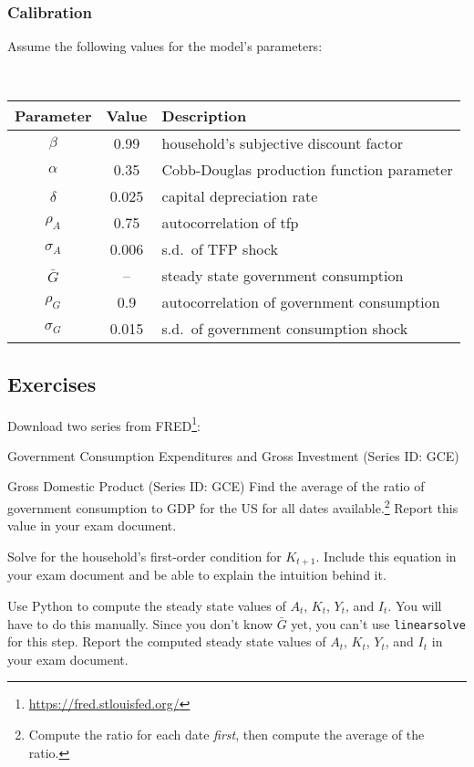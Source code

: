 \subsubsection{Calibration}

Assume the following values for the model's parameters:
	
	\
	
	\begin{center}
	\begin{tabular}{ccl}\textbf{Parameter} & \textbf{Value} & \textbf{Description}\\\hline
	$\beta$		& 0.99		& household's subjective discount factor\\
	$\alpha$	& 0.35		& Cobb-Douglas production function parameter\\
	$\delta$	& 0.025 	& capital depreciation rate\\
	$\rho_A$	& 0.75		& autocorrelation of tfp\\
	$\sigma_A$	& 0.006		& s.d.~of TFP shock\\
	$\bar{G}$	& --		& steady state government consumption\\
	$\rho_G$	& 0.9		& autocorrelation of government consumption\\
	$\sigma_G$	& 0.015		& s.d.~of government consumption shock\\\hline
	\end{tabular}
	\end{center}

\subsection{Exercises}

\EN
{} Download two series from FRED\footnote{\href{https://fred.stlouisfed.org/}{https://fred.stlouisfed.org/}}:
	\IZ
	\item[--] Government Consumption Expenditures and Gross Investment (Series ID: GCE)
	\item[--] Gross Domestic Product (Series ID: GCE)
	\ZI
Find the average of the ratio of government consumption to GDP for the US for all dates available.\footnote{Compute the ratio for each date \emph{first}, then compute the average of the ratio.} Report this value in your exam document.


 Solve for the household's first-order condition for $K_{t+1}$. Include this equation in your exam document and be able to explain the intuition behind it.

 Use Python to compute the steady state values of $A_t$, $K_t$, $Y_t$, and $I_t$. You will have to do this manually. Since you don't know $\bar{G}$ yet, you can't use \verb=linearsolve= for this step. Report the computed steady state values of $A_t$, $K_t$, $Y_t$, and $I_t$ in your exam document.

